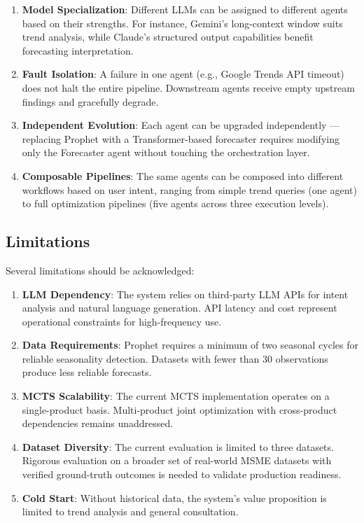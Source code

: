 \documentclass[conference]{IEEEtran}
\begin{document}
\begin{enumerate}
    \item \textbf{Model Specialization}: Different LLMs can be assigned to different agents based on their strengths. For instance, Gemini's long-context window suits trend analysis, while Claude's structured output capabilities benefit forecasting interpretation.
    
    \item \textbf{Fault Isolation}: A failure in one agent (e.g., Google Trends API timeout) does not halt the entire pipeline. Downstream agents receive empty upstream findings and gracefully degrade.
    
    \item \textbf{Independent Evolution}: Each agent can be upgraded independently --- replacing Prophet with a Transformer-based forecaster requires modifying only the Forecaster agent without touching the orchestration layer.
    
    \item \textbf{Composable Pipelines}: The same agents can be composed into different workflows based on user intent, ranging from simple trend queries (one agent) to full optimization pipelines (five agents across three execution levels).
\end{enumerate}

\subsection{Limitations}

Several limitations should be acknowledged:

\begin{enumerate}
    \item \textbf{LLM Dependency}: The system relies on third-party LLM APIs for intent analysis and natural language generation. API latency and cost represent operational constraints for high-frequency use.
    
    \item \textbf{Data Requirements}: Prophet requires a minimum of two seasonal cycles for reliable seasonality detection. Datasets with fewer than 30 observations produce less reliable forecasts.
    
    \item \textbf{MCTS Scalability}: The current MCTS implementation operates on a single-product basis. Multi-product joint optimization with cross-product dependencies remains unaddressed.
    
    \item \textbf{Dataset Diversity}: The current evaluation is limited to three datasets. Rigorous evaluation on a broader set of real-world MSME datasets with verified ground-truth outcomes is needed to validate production readiness.
    
    \item \textbf{Cold Start}: Without historical data, the system's value proposition is limited to trend analysis and general consultation.
\end{enumerate}
\end{document}
